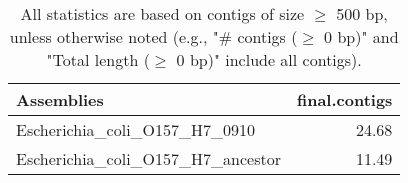 \documentclass[12pt,a4paper]{article}
\begin{document}
\begin{table}[ht]
\begin{center}
\caption{All statistics are based on contigs of size $\geq$ 500 bp, unless otherwise noted (e.g., "\# contigs ($\geq$ 0 bp)" and "Total length ($\geq$ 0 bp)" include all contigs).}
\begin{tabular}{|l*{1}{|r}|}
\hline
Assemblies & final.contigs \\ \hline
Escherichia\_coli\_O157\_H7\_0910 & 24.68 \\ \hline
Escherichia\_coli\_O157\_H7\_ancestor & 11.49 \\ \hline
\end{tabular}
\end{center}
\end{table}
\end{document}
